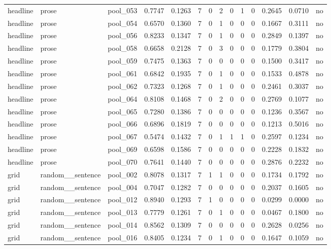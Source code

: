 \begin{table}[t]
{\begin{tabular}{llllllllllllll}
headline & prose & pool\_053 & 0.7747 & 0.1263 & 7 & 0 & 2 & 0 & 1 & 0 & 0.2645 & 0.0710 & no \\
headline & prose & pool\_054 & 0.6570 & 0.1360 & 7 & 0 & 1 & 0 & 0 & 0 & 0.1667 & 0.3111 & no \\
headline & prose & pool\_056 & 0.8233 & 0.1347 & 7 & 0 & 1 & 0 & 0 & 0 & 0.2849 & 0.1397 & no \\
headline & prose & pool\_058 & 0.6658 & 0.2128 & 7 & 0 & 3 & 0 & 0 & 0 & 0.1779 & 0.3804 & no \\
headline & prose & pool\_059 & 0.7475 & 0.1363 & 7 & 0 & 0 & 0 & 0 & 0 & 0.1500 & 0.3417 & no \\
headline & prose & pool\_061 & 0.6842 & 0.1935 & 7 & 0 & 1 & 0 & 0 & 0 & 0.1533 & 0.4878 & no \\
headline & prose & pool\_062 & 0.7323 & 0.1268 & 7 & 0 & 1 & 0 & 0 & 0 & 0.2461 & 0.3037 & no \\
headline & prose & pool\_064 & 0.8108 & 0.1468 & 7 & 0 & 2 & 0 & 0 & 0 & 0.2769 & 0.1077 & no \\
headline & prose & pool\_065 & 0.7280 & 0.1386 & 7 & 0 & 0 & 0 & 0 & 0 & 0.1236 & 0.3567 & no \\
headline & prose & pool\_066 & 0.6896 & 0.1819 & 7 & 0 & 0 & 0 & 0 & 0 & 0.1213 & 0.5016 & no \\
headline & prose & pool\_067 & 0.5474 & 0.1432 & 7 & 0 & 1 & 1 & 1 & 0 & 0.2597 & 0.1234 & no \\
headline & prose & pool\_069 & 0.6598 & 0.1586 & 7 & 0 & 0 & 0 & 0 & 0 & 0.2228 & 0.1832 & no \\
headline & prose & pool\_070 & 0.7641 & 0.1440 & 7 & 0 & 0 & 0 & 0 & 0 & 0.2876 & 0.2232 & no \\
grid & random\_\_sentence & pool\_002 & 0.8078 & 0.1317 & 7 & 1 & 1 & 0 & 0 & 0 & 0.1734 & 0.1792 & no \\
grid & random\_\_sentence & pool\_004 & 0.7047 & 0.1282 & 7 & 0 & 0 & 0 & 0 & 0 & 0.2037 & 0.1605 & no \\
grid & random\_\_sentence & pool\_012 & 0.8940 & 0.1293 & 7 & 1 & 0 & 0 & 0 & 0 & 0.0299 & 0.0000 & no \\
grid & random\_\_sentence & pool\_013 & 0.7779 & 0.1261 & 7 & 0 & 1 & 0 & 0 & 0 & 0.0467 & 0.1800 & no \\
grid & random\_\_sentence & pool\_014 & 0.8562 & 0.1309 & 7 & 0 & 0 & 0 & 0 & 0 & 0.2628 & 0.0256 & no \\
grid & random\_\_sentence & pool\_016 & 0.8405 & 0.1234 & 7 & 0 & 1 & 0 & 0 & 0 & 0.1647 & 0.1059 & no \\

\end{tabular}}
\end{table}
